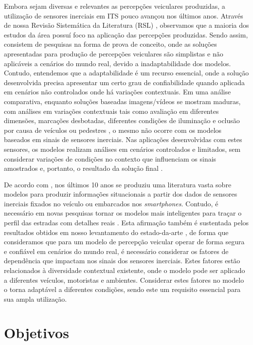 Embora sejam diversas e relevantes as percepções veiculares produzidas, a utilização de sensores inerciais em ITS pouco avançou nos últimos anos. Através de nossa Revisão Sistemática da Literatura (RSL) \cite{menegazzo2018,menegazzo2020}, observamos que a maioria dos estudos da área possuí foco na aplicação das percepções produzidas. Sendo assim, consistem de pesquisas na forma de prova de conceito, onde as soluções apresentadas para produção de percepções veiculares são simplistas e não aplicáveis a cenários do mundo real, devido a inadaptabilidade dos modelos. Contudo, entendemos que a adaptabilidade é um recurso essencial, onde a solução desenvolvida precisa apresentar um certo grau de confiabilidade quando aplicada em cenários não controlados onde há variações contextuais. Em uma análise comparativa, enquanto soluções baseadas imagens/vídeos se mostram maduras, com análises em variações contextuais tais como avaliação em diferentes dimensões, marcações desbotadas, diferentes condições de iluminação e oclusão por causa de veículos ou pedestres \cite{Srimongkon2017, Patil2020}, o mesmo não ocorre com os modelos baseados em sinais de sensores inerciais. Nas aplicações desenvolvidas com estes sensores, os modelos realizam análises em cenários controlados e limitados, sem considerar variações de condições no contexto que influenciam os sinais amostrados e, portanto, o resultado da solução final \cite{menegazzo2018,menegazzo2020}.

De acordo com \cite{Carlos2019}, nos últimos 10 anos se produziu uma literatura vasta sobre modelos para produzir informações situacionais a partir dos dados de sensores inerciais fixados no veículo ou embarcados nos \textit{smartphones}. Contudo, é necessário em novas pesquisas tornar os modelos mais inteligentes para traçar o perfil das estradas com detalhes reais \cite{Carlos2019}. Esta afirmação também é sustentada pelos resultados obtidos em nosso levantamento do estado-da-arte \cite{menegazzo2018,menegazzo2020}, de forma que consideramos que para um modelo de percepção veicular operar de forma segura e confiável em cenários do mundo real, é necessário considerar os fatores de dependência que impactam nos sinais dos sensores inerciais. Estes fatores estão relacionados à diversidade contextual existente, onde o modelo pode ser aplicado a diferentes veículos, motoristas e ambientes. Considerar estes fatores no modelo o torna adaptável a diferentes condições, sendo este um requisito essencial para sua ampla utilização.

\section{Objetivos}

